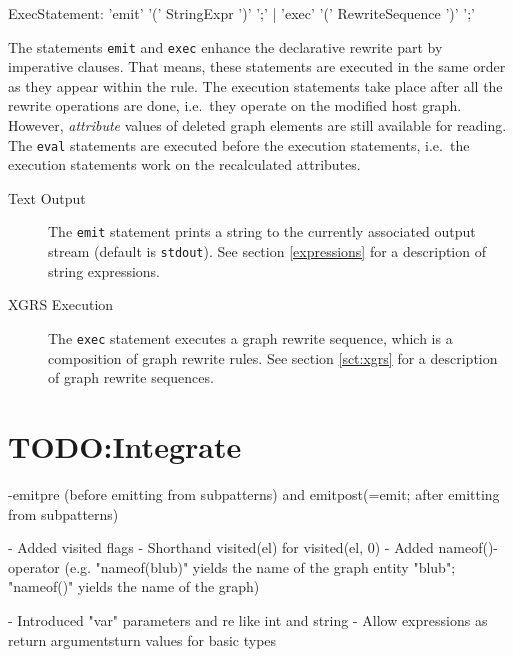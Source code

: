 \begin{rail}  
  ExecStatement: 'emit' '(' StringExpr ')' ';' |
    'exec' '(' RewriteSequence ')' ';'
\end{rail}
The statements \texttt{emit} and \texttt{exec} enhance the declarative rewrite part by imperative clauses.
That means, these statements are executed in the same order as they appear within the rule.
The execution statements take place after all the rewrite operations are done, i.e.\ they operate on the modified host graph.
However, \emph{attribute} values of deleted graph elements are still available for reading.
The \texttt{eval} statements are executed before the execution statements, i.e.\ the execution statements work on the recalculated attributes.
\begin{description}
  \item[Text Output] The \texttt{emit} statement prints a string to the currently associated output stream (default is \texttt{stdout}). See section \ref{expressions} for a description of string expressions.
  \item[XGRS Execution] The \texttt{exec} statement executes a graph rewrite sequence, which is a composition of graph rewrite rules. See section \ref{sct:xgrs} for  a description of graph rewrite sequences.
\end{description}

\section{TODO:Integrate}
-emitpre (before emitting from subpatterns) and emitpost(=emit; after emitting from subpatterns)

  - Added visited flags
- Shorthand visited(el) for visited(el, 0)
 - Added nameof()-operator
    (e.g. "nameof(blub)" yields the name of the graph entity "blub";
     "nameof()" yields the name of the graph)
	 
	 - Introduced "var" parameters and re    like int and string
  - Allow expressions as return argumentsturn values for basic types
